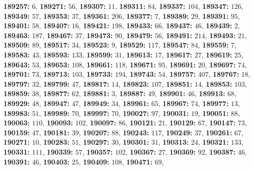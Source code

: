 \textsf{\bfseries 189257:} $6$, \textsf{\bfseries 189271:} $56$, \textsf{\bfseries 189307:} $11$, \textsf{\bfseries 189311:} $84$, \textsf{\bfseries 189337:} $104$, \textsf{\bfseries 189347:} $126$, \textsf{\bfseries 189349:} $57$, \textsf{\bfseries 189353:} $37$, \textsf{\bfseries 189361:} $206$, \textsf{\bfseries 189377:} $7$, \textsf{\bfseries 189389:} $29$, \textsf{\bfseries 189391:} $95$, \textsf{\bfseries 189401:} $58$, \textsf{\bfseries 189407:} $16$, \textsf{\bfseries 189421:} $198$, \textsf{\bfseries 189433:} $66$, \textsf{\bfseries 189437:} $46$, \textsf{\bfseries 189439:} $2$, \textsf{\bfseries 189463:} $187$, \textsf{\bfseries 189467:} $37$, \textsf{\bfseries 189473:} $90$, \textsf{\bfseries 189479:} $56$, \textsf{\bfseries 189491:} $214$, \textsf{\bfseries 189493:} $21$, \textsf{\bfseries 189509:} $89$, \textsf{\bfseries 189517:} $34$, \textsf{\bfseries 189523:} $9$, \textsf{\bfseries 189529:} $117$, \textsf{\bfseries 189547:} $84$, \textsf{\bfseries 189559:} $7$, \textsf{\bfseries 189583:} $43$, \textsf{\bfseries 189593:} $133$, \textsf{\bfseries 189599:} $31$, \textsf{\bfseries 189613:} $17$, \textsf{\bfseries 189617:} $27$, \textsf{\bfseries 189619:} $25$, \textsf{\bfseries 189643:} $53$, \textsf{\bfseries 189653:} $108$, \textsf{\bfseries 189661:} $118$, \textsf{\bfseries 189671:} $95$, \textsf{\bfseries 189691:} $20$, \textsf{\bfseries 189697:} $74$, \textsf{\bfseries 189701:} $73$, \textsf{\bfseries 189713:} $103$, \textsf{\bfseries 189733:} $194$, \textsf{\bfseries 189743:} $54$, \textsf{\bfseries 189757:} $407$, \textsf{\bfseries 189767:} $18$, \textsf{\bfseries 189797:} $32$, \textsf{\bfseries 189799:} $47$, \textsf{\bfseries 189817:} $14$, \textsf{\bfseries 189823:} $107$, \textsf{\bfseries 189851:} $14$, \textsf{\bfseries 189853:} $103$, \textsf{\bfseries 189859:} $38$, \textsf{\bfseries 189877:} $62$, \textsf{\bfseries 189881:} $3$, \textsf{\bfseries 189887:} $49$, \textsf{\bfseries 189901:} $46$, \textsf{\bfseries 189913:} $68$, \textsf{\bfseries 189929:} $48$, \textsf{\bfseries 189947:} $47$, \textsf{\bfseries 189949:} $34$, \textsf{\bfseries 189961:} $65$, \textsf{\bfseries 189967:} $74$, \textsf{\bfseries 189977:} $13$, \textsf{\bfseries 189983:} $51$, \textsf{\bfseries 189989:} $70$, \textsf{\bfseries 189997:} $70$, \textsf{\bfseries 190027:} $97$, \textsf{\bfseries 190031:} $19$, \textsf{\bfseries 190051:} $88$, \textsf{\bfseries 190063:} $110$, \textsf{\bfseries 190093:} $102$, \textsf{\bfseries 190097:} $86$, \textsf{\bfseries 190121:} $21$, \textsf{\bfseries 190129:} $67$, \textsf{\bfseries 190147:} $73$, \textsf{\bfseries 190159:} $47$, \textsf{\bfseries 190181:} $39$, \textsf{\bfseries 190207:} $88$, \textsf{\bfseries 190243:} $117$, \textsf{\bfseries 190249:} $37$, \textsf{\bfseries 190261:} $67$, \textsf{\bfseries 190271:} $10$, \textsf{\bfseries 190283:} $51$, \textsf{\bfseries 190297:} $30$, \textsf{\bfseries 190301:} $31$, \textsf{\bfseries 190313:} $24$, \textsf{\bfseries 190321:} $133$, \textsf{\bfseries 190331:} $111$, \textsf{\bfseries 190339:} $57$, \textsf{\bfseries 190357:} $102$, \textsf{\bfseries 190367:} $27$, \textsf{\bfseries 190369:} $92$, \textsf{\bfseries 190387:} $46$, \textsf{\bfseries 190391:} $46$, \textsf{\bfseries 190403:} $25$, \textsf{\bfseries 190409:} $108$, \textsf{\bfseries 190471:} $69$, 
